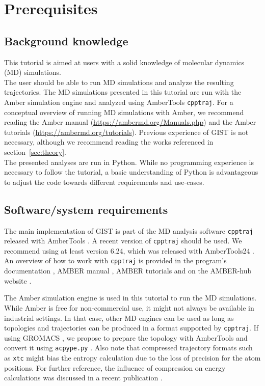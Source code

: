 \documentclass[9pt,tutorial]{livecoms}
\newcommand{\software}{\texttt}
\newcommand\inlinecode{\texttt}
\begin{document}
\section{Prerequisites}


\subsection{Background knowledge}
This tutorial is aimed at users with a solid knowledge of molecular dynamics (MD) simulations.\\
The user should be able to run MD simulations and analyze the resulting trajectories. 
The MD simulations presented in this tutorial are run with the Amber simulation engine and analyzed using AmberTools \software{cpptraj}. 
For a conceptual overview of running MD simulations with Amber, we recommend reading the Amber manual (\url{https://ambermd.org/Manuals.php}) \cite{amber24} and the Amber tutorials (\url{https://ambermd.org/tutorials}). 
Previous experience of GIST is not necessary, although we recommend reading the works referenced in section~\ref{sec:theory}.\\
The presented analyses are run in Python.
While no programming experience is necessary to follow the tutorial, a basic understanding of Python is advantageous to adjust the code towards different requirements and use-cases.

\subsection{Software/system requirements}
The main implementation of GIST is part of the MD analysis software \software{cpptraj} released with AmberTools \cite{amber24, Case2023-ambertools}.
A recent version of \software{cpptraj} should be used. We recommend using at least version 6.24, which was released with AmberTools24 \cite{Case2023-ambertools}. 
An overview of how to work with \software{cpptraj} is provided in the program's documentation \cite{cpptraj_doc}, AMBER manual \cite{amber24}, AMBER tutorials \cite{amber_tut_cpptraj} and on the AMBER-hub website \cite{amber_hub}.

The Amber simulation engine is used in this tutorial to run the MD simulations.
While Amber is free for non-commercial use, it might not always be available in industrial settings.
In that case, other MD engines can be used as long as topologies and trajectories can be produced in a format supported by \software{cpptraj}.
If using GROMACS \cite{Abraham2015-gromacs,Pronk2013-gromacs}, we propose to prepare the topology with AmberTools \cite{Case2023-ambertools} and convert it using \software{acpype.py} \cite{Sousa_da_Silva2012-acpype}.
Also note that compressed trajectory formats such as \inlinecode{xtc} might bias the entropy calculation due to the loss of precision for the atom positions. For further reference, the influence of compression on energy calculations was discussed in a recent publication \cite{Roe2022-compression}.
\end{document}
